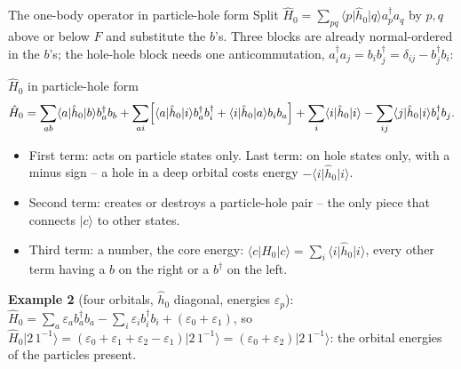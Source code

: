 \documentclass[aspectratio=169,10pt]{beamer}
\newcommand{\ket}[1]{\vert #1\rangle}
\newcommand{\bra}[1]{\langle #1\vert}
\newcommand{\element}[3]{\langle #1\vert #2\vert #3\rangle}
\begin{document}
\begin{frame}{The one-body operator in particle-hole form}
  \small
  Split $\hat{H}_0=\sum_{pq}\element{p}{\hat{h}_0}{q}a_p^{\dagger}a_q$ by $p,q$ above or below $F$ and substitute the $b$'s. Three blocks are already normal-ordered in the $b$'s; the hole-hole block needs one anticommutation, $a_i^{\dagger}a_j=b_ib_j^{\dagger}=\delta_{ij}-b_j^{\dagger}b_i$:
  \begin{block}{$\hat{H}_0$ in particle-hole form}
    \[
      \hat{H}_0=\sum_{ab}\element{a}{\hat{h}_0}{b}b_a^{\dagger}b_b
      +\sum_{ai}\Bigl[\element{a}{\hat{h}_0}{i}b_a^{\dagger}b_i^{\dagger}+\element{i}{\hat{h}_0}{a}b_ib_a\Bigr]
      +\sum_i\element{i}{\hat{h}_0}{i}
      -\sum_{ij}\element{j}{\hat{h}_0}{i}b_i^{\dagger}b_j .
    \]
  \end{block}
  \begin{itemize}
    \item First term: acts on particle states only. Last term: on hole states only, with a \alert{minus sign} -- a hole in a deep orbital costs energy $-\element{i}{\hat{h}_0}{i}$.
    \item Second term: \alert{creates or destroys a particle-hole pair} -- the only piece that connects $\ket{c}$ to other states.
    \item Third term: a number, the core energy: $\bra{c}\hat{H}_0\ket{c}=\sum_i\element{i}{\hat{h}_0}{i}$, every other term having a $b$ on the right or a $b^{\dagger}$ on the left.
  \end{itemize}
  \textbf{Example 2} (four orbitals, $\hat{h}_0$ diagonal, energies $\varepsilon_p$): $\hat{H}_0=\sum_a\varepsilon_ab_a^{\dagger}b_a-\sum_i\varepsilon_ib_i^{\dagger}b_i+(\varepsilon_0+\varepsilon_1)$, so $\hat{H}_0\ket{2\,1^{-1}}=(\varepsilon_0+\varepsilon_1+\varepsilon_2-\varepsilon_1)\ket{2\,1^{-1}}=(\varepsilon_0+\varepsilon_2)\ket{2\,1^{-1}}$: the orbital energies of the particles present. \checkmark
\end{frame}
\end{document}

